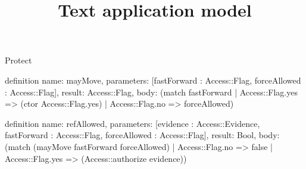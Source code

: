 \begin{lexlean}{Protect}
\title{Text application model}
\begin{semanticmodule}
definition{
  name: mayMove,
  parameters: [fastForward : Access::Flag, forceAllowed : Access::Flag],
  result: Access::Flag,
  body: (match fastForward
    | Access::Flag.yes => (ctor Access::Flag.yes)
    | Access::Flag.no => forceAllowed)
}

definition{
  name: refAllowed,
  parameters: [evidence : Access::Evidence, fastForward : Access::Flag, forceAllowed : Access::Flag],
  result: Bool,
  body: (match (mayMove fastForward forceAllowed)
    | Access::Flag.no => false
    | Access::Flag.yes => (Access::authorize evidence))
}
\end{semanticmodule}
\end{lexlean}
